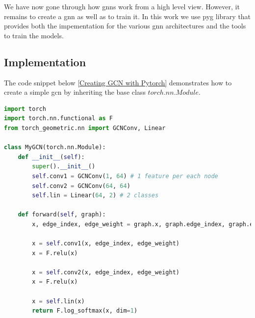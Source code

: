 We have now gone through how \gls{gnn}s work from a high level view. However, it remains to create a \gls{gnn} as well as to train it. In this work we use \gls{pyg} library \cite{pytorchlib} that provides both the impementation for the various \gls{gnn} architectures and the tools to train the models. 

\subsection{Implementation}

The code snippet below \ref{Creating GCN with Pytorch} demonstrates how to create a simple \gls{gcn} by inheriting the base class $torch.nn.Module$. 

\begin{lstlisting}[caption={Creating GCN with Pytorch}, label={Creating GCN with Pytorch}, language=Python]
import torch
import torch.nn.functional as F
from torch_geometric.nn import GCNConv, Linear

class MyGCN(torch.nn.Module):
    def __init__(self):
        super().__init__()
        self.conv1 = GCNConv(1, 64) # 1 feature per each node
        self.conv2 = GCNConv(64, 64)
        self.lin = Linear(64, 2) # 2 classes 

    def forward(self, graph):        
        x, edge_index, edge_weight = graph.x, graph.edge_index, graph.edge_weight
        
        x = self.conv1(x, edge_index, edge_weight)
        x = F.relu(x)
        
        x = self.conv2(x, edge_index, edge_weight)
        x = F.relu(x)
        
        x = self.lin(x)
        return F.log_softmax(x, dim=1)    
\end{lstlisting}

